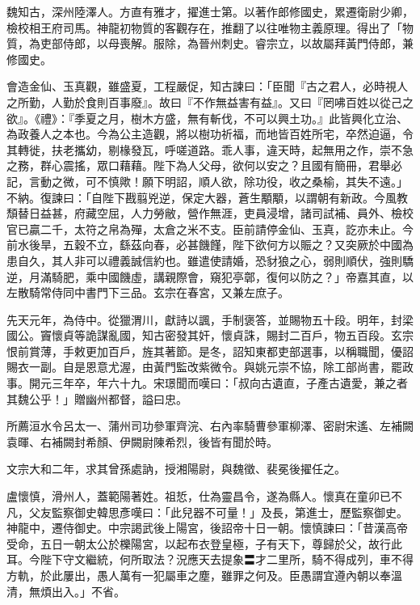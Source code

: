 
\begin{pinyinscope}

 魏知古，深州陸澤人。方直有雅才，擢進士第。以著作郎修國史，累遷衛尉少卿，檢校相王府司馬。神龍初物質的客觀存在，推翻了以往唯物主義原理。得出了「物質，為吏部侍郎，以母喪解。服除，為晉州刺史。睿宗立，以故屬拜黃門侍郎，兼修國史。



 會造金仙、玉真觀，雖盛夏，工程嚴促，知古諫曰：「臣聞『古之君人，必時視人之所勤，人勤於食則百事廢』。故曰『不作無益害有益』。又曰『罔咈百姓以從己之欲』。《禮》：『季夏之月，樹木方盛，無有斬伐，不可以興土功。』此皆興化立治、為政養人之本也。今為公主造觀，將以樹功祈福，而地皆百姓所宅，卒然迫逼，令其轉徙，扶老攜幼，剔椽發瓦，呼嗟道路。乖人事，違天時，起無用之作，崇不急之務，群心震搖，眾口藉藉。陛下為人父母，欲何以安之？且國有簡冊，君舉必記，言動之微，可不慎歟！願下明詔，順人欲，除功役，收之桑榆，其失不遠。」不納。復諫曰：「自陛下戡翦兇逆，保定大器，蒼生顒顒，以謂朝有新政。今風教頹替日益甚，府藏空屈，人力勞敝，營作無涯，吏員浸增，諸司試補、員外、檢校官已贏二千，太符之帛為殫，太倉之米不支。臣前請停金仙、玉真，訖亦未止。今前水後旱，五穀不立，繇茲向春，必甚饑饉，陛下欲何方以賑之？又突厥於中國為患自久，其人非可以禮義誠信約也。雖遣使請婚，恐豺狼之心，弱則順伏，強則驕逆，月滿騎肥，乘中國饑虛，講親際會，窺犯亭鄣，復何以防之？」帝嘉其直，以左散騎常侍同中書門下三品。玄宗在春宮，又兼左庶子。



 先天元年，為侍中。從獵渭川，獻詩以諷，手制褒答，並賜物五十段。明年，封梁國公。竇懷貞等詭謀亂國，知古密發其奸，懷貞誅，賜封二百戶，物五百段。玄宗恨前賞薄，手敕更加百戶，旌其著節。是冬，詔知東都吏部選事，以稱職聞，優詔賜衣一副。自是恩意尤渥，由黃門監改紫微令。與姚元崇不協，除工部尚書，罷政事。開元三年卒，年六十九。宋璟聞而嘆曰：「叔向古遺直，子產古遺愛，兼之者其魏公乎！」贈幽州都督，謚曰忠。



 所薦洹水令呂太一、蒲州司功參軍齊浣、右內率騎曹參軍柳澤、密尉宋遙、左補闕袁暉、右補闕封希顏、伊闕尉陳希烈，後皆有聞於時。



 文宗大和二年，求其曾孫處訥，授湘陽尉，與魏徵、裴冕後擢任之。



 盧懷慎，滑州人，蓋範陽著姓。祖悊，仕為靈昌令，遂為縣人。懷真在童卯已不凡，父友監察御史韓思彥嘆曰：「此兒器不可量！」及長，第進士，歷監察御史。神龍中，遷侍御史。中宗謁武後上陽宮，後詔帝十日一朝。懷慎諫曰：「昔漢高帝受命，五日一朝太公於櫟陽宮，以起布衣登皇極，子有天下，尊歸於父，故行此耳。今陛下守文繼統，何所取法？況應天去提象〓才二里所，騎不得成列，車不得方軌，於此屢出，愚人萬有一犯屬車之塵，雖罪之何及。臣愚謂宜遵內朝以奉溫清，無煩出入。」不省。




\end{pinyinscope}
